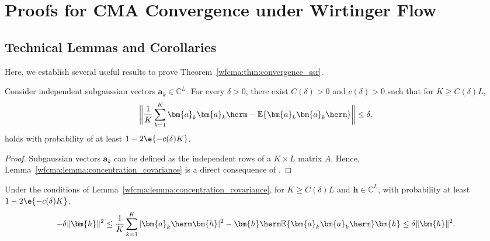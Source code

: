 \chapter{Proofs for CMA Convergence under Wirtinger Flow}

\section{Technical Lemmas and Corollaries} \label{wfcma:appdx}
Here, we establish several useful results to prove Theorem~\ref{wfcma:thm:convergence_ssr}.  
\begin{lem}
	\label{wfcma:lemma:concentration_covariance}
	Consider independent subgaussian vectors $\bm{a}_k\in\mathbb{C}^L$. For every $\delta>0$, there exist $C(\delta)>0$ and $c(\delta)>0$ such that for $K\geq C(\delta)L$,
	\begin{equation}
		\bigg\|\frac{1}{K}\sum_{k=1}^K\bm{a}_k\bm{a}_k\herm-\mathbb{E}\{\bm{a}_k\bm{a}_k\herm\}\bigg\| \leq \delta,\nonumber%
	\end{equation}
	holds with probability of at least $1-2\e{-c(\delta) K}$.
\end{lem}
\begin{proof} Subgaussian vectors $\bm{a}_k$ can be defined as the independent rows of a $K\times L$ matrix $A$. Hence, Lemma~\ref{wfcma:lemma:concentration_covariance} is a direct consequence of \cite[Theorem 5.39]{Vershynin2012nonasymptoticmatrices}.
\end{proof}	

\begin{cor} \label{wfcma:cor:abs_s}	 
	Under the conditions of Lemma~\ref{wfcma:lemma:concentration_covariance}, for $K\geq C(\delta)L$ and $\bm{h}\in\mathbb{C}^L$, with probability at least $1-2\e{-c(\delta) K}$,
	\begin{equation}
		-\delta\|\bm{h}\|^2\leq \frac{1}{K}\sum_{k=1}^K|\bm{a}_k\herm\bm{h}|^2- \bm{h}\herm\mathbb{E}\{\bm{a}_k\bm{a}_k\herm\}\bm{h}\leq\delta\|\bm{h}\|^2. \nonumber%
	\end{equation}
\end{cor}

